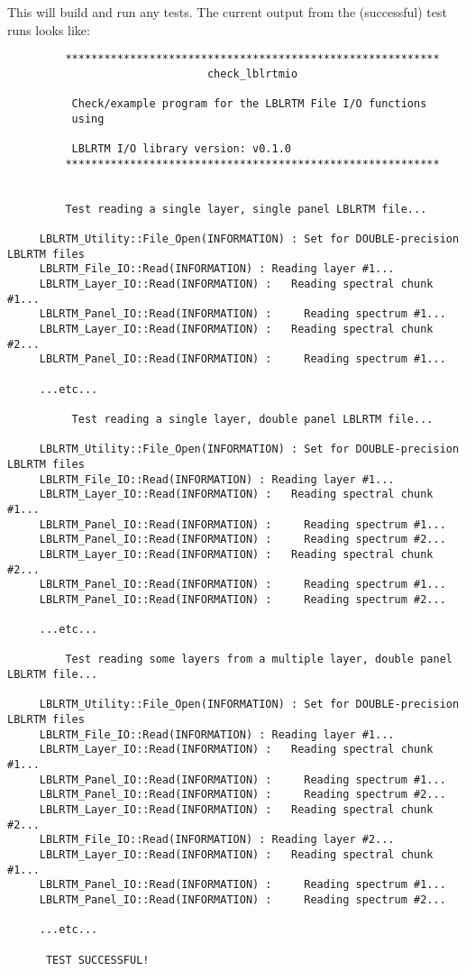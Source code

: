 This will build and run any tests. The current output from the (successful) test runs looks like:
\begin{verbatim}
         **********************************************************
                               check_lblrtmio

          Check/example program for the LBLRTM File I/O functions
          using

          LBLRTM I/O library version: v0.1.0
         **********************************************************


         Test reading a single layer, single panel LBLRTM file...

     LBLRTM_Utility::File_Open(INFORMATION) : Set for DOUBLE-precision LBLRTM files
     LBLRTM_File_IO::Read(INFORMATION) : Reading layer #1...
     LBLRTM_Layer_IO::Read(INFORMATION) :   Reading spectral chunk #1...
     LBLRTM_Panel_IO::Read(INFORMATION) :     Reading spectrum #1...
     LBLRTM_Layer_IO::Read(INFORMATION) :   Reading spectral chunk #2...
     LBLRTM_Panel_IO::Read(INFORMATION) :     Reading spectrum #1...

     ...etc...

          Test reading a single layer, double panel LBLRTM file...

     LBLRTM_Utility::File_Open(INFORMATION) : Set for DOUBLE-precision LBLRTM files
     LBLRTM_File_IO::Read(INFORMATION) : Reading layer #1...
     LBLRTM_Layer_IO::Read(INFORMATION) :   Reading spectral chunk #1...
     LBLRTM_Panel_IO::Read(INFORMATION) :     Reading spectrum #1...
     LBLRTM_Panel_IO::Read(INFORMATION) :     Reading spectrum #2...
     LBLRTM_Layer_IO::Read(INFORMATION) :   Reading spectral chunk #2...
     LBLRTM_Panel_IO::Read(INFORMATION) :     Reading spectrum #1...
     LBLRTM_Panel_IO::Read(INFORMATION) :     Reading spectrum #2...

     ...etc...

         Test reading some layers from a multiple layer, double panel LBLRTM file...

     LBLRTM_Utility::File_Open(INFORMATION) : Set for DOUBLE-precision LBLRTM files
     LBLRTM_File_IO::Read(INFORMATION) : Reading layer #1...
     LBLRTM_Layer_IO::Read(INFORMATION) :   Reading spectral chunk #1...
     LBLRTM_Panel_IO::Read(INFORMATION) :     Reading spectrum #1...
     LBLRTM_Panel_IO::Read(INFORMATION) :     Reading spectrum #2...
     LBLRTM_Layer_IO::Read(INFORMATION) :   Reading spectral chunk #2...
     LBLRTM_File_IO::Read(INFORMATION) : Reading layer #2...
     LBLRTM_Layer_IO::Read(INFORMATION) :   Reading spectral chunk #1...
     LBLRTM_Panel_IO::Read(INFORMATION) :     Reading spectrum #1...
     LBLRTM_Panel_IO::Read(INFORMATION) :     Reading spectrum #2...

     ...etc...

      TEST SUCCESSFUL!
\end{verbatim}

